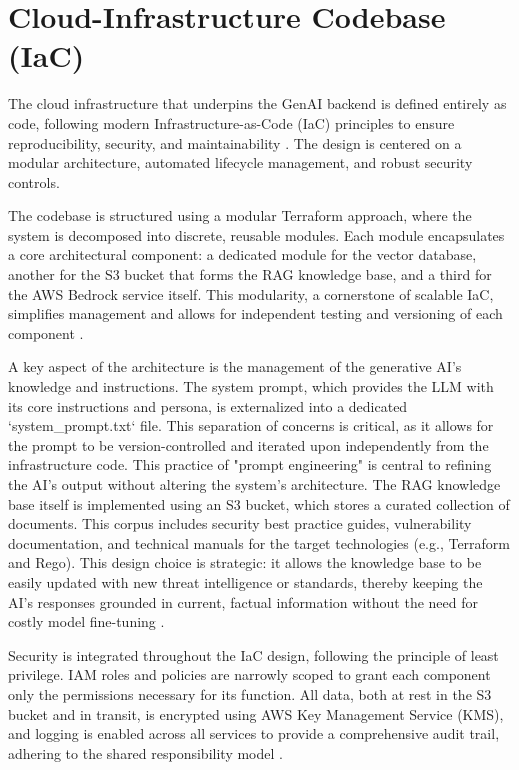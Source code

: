 \section{Cloud-Infrastructure Codebase (IaC)}

The cloud infrastructure that underpins the GenAI backend is defined entirely as code, following modern Infrastructure-as-Code (IaC) principles to ensure reproducibility, security, and maintainability \cite{morris_infrastructure_2016}. The design is centered on a modular architecture, automated lifecycle management, and robust security controls.

The codebase is structured using a modular Terraform approach, where the system is decomposed into discrete, reusable modules. Each module encapsulates a core architectural component: a dedicated module for the vector database, another for the S3 bucket that forms the RAG knowledge base, and a third for the AWS Bedrock service itself. This modularity, a cornerstone of scalable IaC, simplifies management and allows for independent testing and versioning of each component \cite{hashicorp_terraform_2022}.

A key aspect of the architecture is the management of the generative AI's knowledge and instructions. The system prompt, which provides the LLM with its core instructions and persona, is externalized into a dedicated `system_prompt.txt` file. This separation of concerns is critical, as it allows for the prompt to be version-controlled and iterated upon independently from the infrastructure code. This practice of "prompt engineering" is central to refining the AI's output without altering the system's architecture. The RAG knowledge base itself is implemented using an S3 bucket, which stores a curated collection of documents. This corpus includes security best practice guides, vulnerability documentation, and technical manuals for the target technologies (e.g., Terraform and Rego). This design choice is strategic: it allows the knowledge base to be easily updated with new threat intelligence or standards, thereby keeping the AI's responses grounded in current, factual information without the need for costly model fine-tuning \cite{ozgur_simple_2024}.

Security is integrated throughout the IaC design, following the principle of least privilege. IAM roles and policies are narrowly scoped to grant each component only the permissions necessary for its function. All data, both at rest in the S3 bucket and in transit, is encrypted using AWS Key Management Service (KMS), and logging is enabled across all services to provide a comprehensive audit trail, adhering to the shared responsibility model \cite{sarathe_krisshnan_jutoo_vijayaraghavan_policy_2025}.

